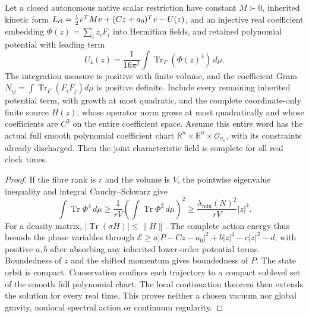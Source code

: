 \documentclass[11pt,a4paper]{article}
\begin{document}
\begin{proposition}
\label{p3f:prop:v2190-polynomial-continuation}
Let a closed autonomous native scalar restriction have constant
\(M\succ0\), inherited kinetic form
\(L_{\rm cl}=\tfrac12v^TMv+(Cz+a_0)^Tv-U(z)\), and an injective real coefficient embedding
\(\Phi(z)=\sum_i z_iF_i\) into Hermitian fields, and retained polynomial
potential with leading term
\[
 U_4(z)=\frac1{16\pi^2}\int\operatorname{Tr}_F(\Phi(z)^4)\,d\mu.
\]
The integration measure is positive with finite volume, and the coefficient
Gram \(N_{ij}=\int\operatorname{Tr}_F(F_iF_j)d\mu\) is positive definite.
Include every remaining inherited potential term, with growth at most
quadratic, and the complete coordinate-only finite source \(H(z)\), whose
operator norm grows at most quadratically and whose coefficients are
\(C^3\) on the entire coefficient space.  Assume this entire word has the
actual full smooth polynomial coefficient chart \(\mathbb R^n\times\mathbb R^n\times
\mathcal O_{\sigma_0}\), with its constraints already discharged.
Then the joint characteristic field is complete for all real clock times.
\end{proposition}
\begin{proof}
If the fibre rank is \(r\) and the volume is \(V\), the pointwise eigenvalue
inequality and integral Cauchy--Schwarz give
\[
 \int\operatorname{Tr}\Phi^4\,d\mu
 \ge\frac1{rV}\left(\int\operatorname{Tr}\Phi^2\,d\mu\right)^2
 \ge\frac{\lambda_{\min}(N)^2}{rV}|z|^4.
\]
For a density matrix, \(|\operatorname{Tr}(\sigma H)|\le\|H\|\).
The complete action energy thus bounds the phase variables through
\(\mathcal E\ge a|P-Cz-a_0|^2+b|z|^4-c|z|^2-d\), with positive \(a,b\)
after absorbing any inherited lower-order potential terms.  Boundedness
of \(z\) and the shifted momentum gives boundedness of \(P\).
The state orbit is compact.
Conservation confines each trajectory to a compact sublevel set of the
smooth full polynomial chart.  The local continuation theorem then extends
the solution for every real time.  This proves neither a chosen vacuum nor
global gravity, nonlocal spectral action or continuum regularity.
\end{proof}
\end{document}
